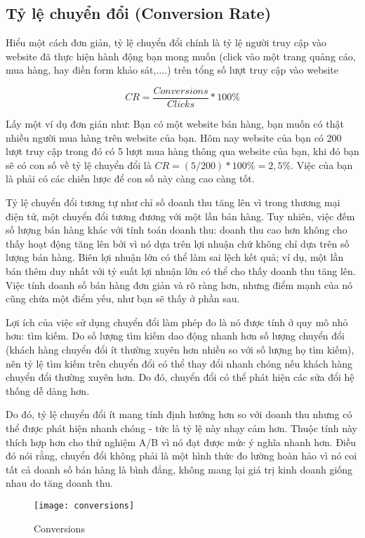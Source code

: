 \subsection{Tỷ lệ chuyển đổi (Conversion Rate)}

Hiểu một cách đơn giản, tỷ lệ chuyển đổi chính là tỷ lệ người truy cập vào website đã thực hiện hành động bạn mong muốn (click vào một trang quảng cáo, mua hàng, hay điền form khảo sát,....) trên tổng số lượt truy cập vào website

\begin{displaymath}
	CR = \frac{Conversions}{Clicks} * 100\%
\end{displaymath}

Lấy một ví dụ đơn giản như: Bạn có một website bán hàng, bạn muốn có thật nhiều người mua hàng trên website của bạn. Hôm nay website của bạn có 200 lượt truy cập trong đó có 5 lượt mua hàng thông qua website của bạn, khi đó bạn sẽ có con số về tỷ lệ chuyển đổi là $CR = (5/200) * 100\% = 2,5\%$. Việc của bạn là phải có các chiến lược để con số này càng cao càng tốt.

Tỷ lệ chuyển đổi tương tự như chỉ số doanh thu tăng lên vì trong thương mại điện tử, một chuyển đổi tương đương với một lần bán hàng. Tuy nhiên, việc đếm số lượng bán hàng khác với tính toán doanh thu: doanh thu cao hơn không cho thấy hoạt động tăng lên bởi vì nó dựa trên lợi nhuận chứ không chỉ dựa trên số lượng bán hàng. Biên lợi nhuận lớn có thể làm sai lệch kết quả; ví dụ, một lần bán thêm duy nhất với tỷ suất lợi nhuận lớn có thể cho thấy doanh thu tăng lên. Việc tính doanh số bán hàng đơn giản và rõ ràng hơn, nhưng điểm mạnh của nó cũng chứa một điểm yếu, như bạn sẽ thấy ở phần sau.

Lợi ích của việc sử dụng chuyển đổi làm phép đo là nó được tính ở quy mô nhỏ hơn: tìm kiếm. Do số lượng tìm kiếm dao động nhanh hơn số lượng chuyển đổi (khách hàng chuyển đổi ít thường xuyên hơn nhiều so với số lượng họ tìm kiếm), nên tỷ lệ tìm kiếm trên chuyển đổi có thể thay đổi nhanh chóng nếu khách hàng chuyển đổi thường xuyên hơn. Do đó, chuyển đổi có thể phát hiện các sửa đổi hệ thống dễ dàng hơn.

Do đó, tỷ lệ chuyển đổi ít mang tính định hướng hơn so với doanh thu nhưng có thể được phát hiện nhanh chóng - tức là tỷ lệ này nhạy cảm hơn. Thuộc tính này thích hợp hơn cho thử nghiệm A/B vì nó đạt được mức ý nghĩa nhanh hơn. Điều đó nói rằng, chuyển đổi không phải là một hình thức đo lường hoàn hảo vì nó coi tất cả doanh số bán hàng là bình đẳng, không mang lại giá trị kinh doanh giống nhau do tăng doanh thu.
\begin{figure}[H]
	\centering
	\texttt{[image: conversions]}
	\caption{Conversions}
\end{figure}

